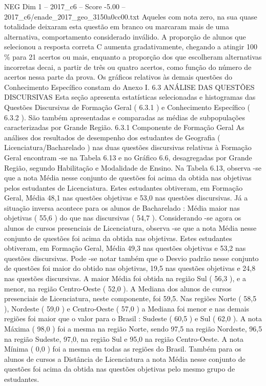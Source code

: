 \begin{textsample}{NEG Dim 1 – 2017\_c6 – Score -5.00 – 2017\_c6/enade\_2017\_geo\_3150a0cc00.txt}
Aqueles com nota zero, na sua quase totalidade deixaram esta questão em branco ou marcaram mais de uma alternativa, comportamento considerado inválido.
A proporção de alunos que selecionou a resposta correta C aumenta gradativamente, chegando a atingir 100 \% para 21 acertos ou mais, enquanto a proporção dos que escolheram alternativas incorretas decai, a partir de três ou quatro acertos, como função do número de acertos nessa parte da prova.
Os gráficos relativos às demais questões do Conhecimento Específico constam do Anexo I. 6.3 ANÁLISE DAS QUESTÕES DISCURSIVAS Esta seção apresenta estatísticas selecionadas e histogramas das Questões Discursivas de Formação Geral ( 6.3.1 ) e Conhecimento Específico ( 6.3.2 ).
São também apresentadas e comparadas as médias de subpopulações caracterizadas por Grande Região. 6.3.1 Componente de Formação Geral As análises dos resultados de desempenho dos estudantes de Geografia ( Licenciatura/Bacharelado ) nas duas questões discursivas relativas à Formação Geral encontram -se na Tabela 6.13 e no Gráfico 6.6, desagregadas por Grande Região, segundo Habilitação e Modalidade de Ensino.
Na Tabela 6.13, observa -se que a nota Média nesse conjunto de questões foi acima da obtida nas objetivas pelos estudantes de Licenciatura.
Estes estudantes obtiveram, em Formação Geral, Média 48,1 nas questões objetivas e 53,0 nas questões discursivas.
Já a situação inversa acontece para os alunos de Bacharelado : Média maior nas objetivas ( 55,6 ) do que nas discursivas ( 54,7 ).
Considerando -se agora os alunos de cursos presenciais de Licenciatura, observa -se que a nota Média nesse conjunto de questões foi acima da obtida nas objetivas.
Estes estudantes obtiveram, em Formação Geral, Média 49,3 nas questões objetivas e 53,2 nas questões discursivas.
Pode -se notar também que o Desvio padrão nesse conjunto de questões foi maior do obtido nas objetivas, 19,5 nas questões objetivas e 24,8 nas questões discursivas.
A maior Média foi obtida na região Sul ( 56,3 ), e a menor, na região Centro-Oeste ( 52,0 ).
A Mediana dos alunos de cursos presenciais de Licenciatura, neste componente, foi 59,5.
Nas regiões Norte ( 58,5 ), Nordeste ( 59,0 ) e Centro-Oeste ( 57,0 ) a Mediana foi menor e nas demais regiões foi maior que o valor para o Brasil : Sudeste ( 60,5 ) e Sul ( 62,0 ).
A nota Máxima ( 98,0 ) foi a mesma na região Norte, sendo 97,5 na região Nordeste, 96,5 na região Sudeste, 97,0, na região Sul e 95,0 na região Centro-Oeste.
A nota Mínima ( 0,0 ) foi a mesma em todas as regiões do Brasil.
Também para os alunos de cursos a Distância de Licenciatura a nota Média nesse conjunto de questões foi acima da obtida nas questões objetivas pelo mesmo grupo de estudantes.

\end{textsample}
